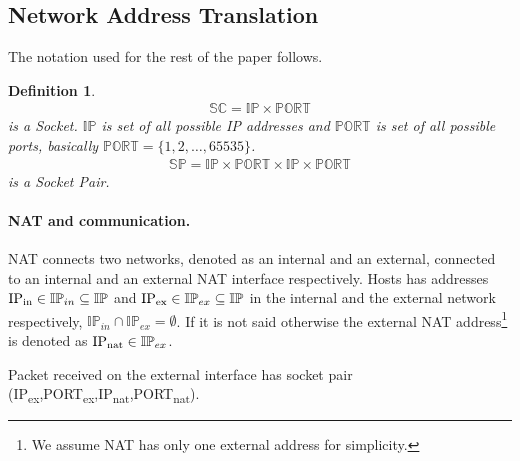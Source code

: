 \documentclass[twoside]{article}
\newtheorem{mydef}{Definition}
\begin{document}
\begin{multicols}{2}
\section{Network Address Translation}
The notation used for the rest of the paper follows.


\begin{mydef}
\begin{align*}
\mathbb{SC} = \mathbb{IP} \times \mathbb{PORT}
\end{align*} is a Socket. $\mathbb{IP}$ is set of all possible IP addresses and $\mathbb{PORT}$ 
is set of all possible ports, basically $\mathbb{PORT} = \{1,2,\dots,65535\}$.
\begin{align*}
\mathbb{SP} = \mathbb{IP} \times \mathbb{PORT} \times \mathbb{IP} \times \mathbb{PORT}
\end{align*} is a Socket Pair.
\end{mydef}
% 

\paragraph{NAT and communication.}
NAT connects two networks, denoted as an internal and an external, connected to an internal and an external NAT interface respectively.
Hosts has addresses $\text{IP\textsubscript{in}} \in \mathbb{IP}_{in} \subseteq \mathbb{IP}$ 
and $\text{IP\textsubscript{ex}} \in \mathbb{IP}_{ex} \subseteq \mathbb{IP}$ in the internal and the external network
respectively, $\mathbb{IP}_{in} \cap \mathbb{IP}_{ex} = \emptyset$.
If it is not said otherwise the external NAT address\footnote{We assume NAT has only one external address for simplicity.} is denoted as 
$\text{IP\textsubscript{nat}} \in \mathbb{IP}_{ex}$.

Packet received on the external interface has socket pair {(IP\textsubscript{ex},PORT\textsubscript{ex},IP\textsubscript{nat},PORT\textsubscript{nat})}.


\end{multicols}
\end{document}
